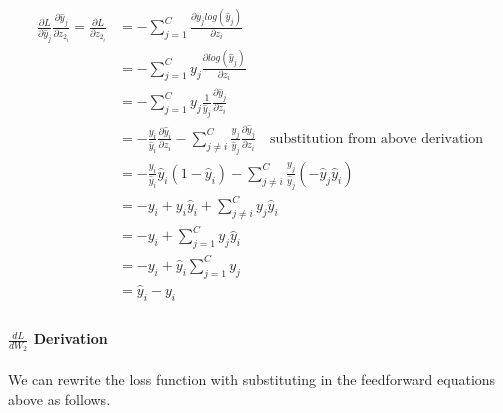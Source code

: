 \documentclass[]{article}
\begin{document}
\begin{align*}
 \frac{\partial L }{\partial  \hat{y}_{j} }  \frac{\partial  \hat{y}_{j} }{\partial z_{2_i}}  =\frac{\partial L}{\partial z_{2_i}} &= - \sum_{j=1}^C \frac{\partial y_j log(\hat{y}_j)}{\partial z_i}{} \\
&=- \sum_{j=1}^C y_j \frac{\partial log(\hat{y}_j)}{\partial z_i} \\
&= - \sum_{j=1}^C y_j \frac{1}{\hat{y}_j} \frac{\partial \hat{y}_j}{\partial z_i} \\
&= - \frac{y_i}{\hat{y}_i} \frac{\partial \hat{y}_i}{\partial z_i} - \sum_{j \neq i}^C \frac{y_j}{\hat{y}_j} \frac{\partial \hat{y}_j}{\partial z_i} \quad \text{substitution from above derivation}\\
&= - \frac{y_i}{\hat{y}_i} \hat{y}_i (1-\hat{y}_i) - \sum_{j \neq i}^C \frac{y_j}{\hat{y}_j} (-\hat{y}_j \hat{y}_i) \\
&= - y_i + y_i \hat{y}_i + \sum_{j \neq i}^C y_j \hat{y}_i  \\
&= - y_i + \sum_{j = 1}^C y_j \hat{y}_i \\
&= -y_i + \hat{y}_i \sum_{j = 1}^C y_j \\
& = \hat{y}_i - y_i \\
\end{align*}
\paragraph{ $\frac{dL}{dW_2}$ Derivation}
We can rewrite the loss function with substituting in the feedforward equations above as follows.
\end{document}
